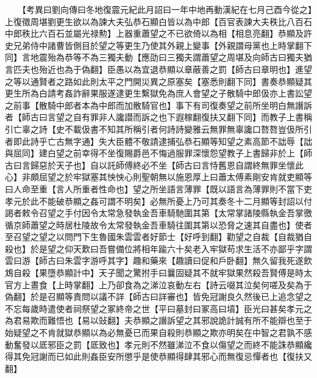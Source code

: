 　　【考異曰劉向傳曰冬地復震元紀此月詔曰一年中地再動漢紀在七月己酉今從之】　上復徵周堪劉更生欲以為諫大夫弘恭石顯白皆以為中郎【百官表諫大夫秩比八百石中郎秩比六百石並屬光禄勲】上器重蕭望之不已欲倚以為相【相息亮翻】恭顯及許史兄弟侍中諸曹皆側目於望之等更生乃使其外親上變事【外親謂母黨也上時掌翻下同】言地震殆為恭等不為三獨夫動【應劭曰三獨夫謂蕭望之周堪及向師古曰獨夫猶言匹夫也殆近也為于偽翻】臣愚以為宜退恭顯以章蔽善之罰【師古曰章明也】進望之等以通賢者之路如此則太平之門開災異之原塞矣【塞悉則翻下同】書奏恭顯疑其更生所為白請考姦詐辭果服遂逮更生繫獄免為庶人會望之子散騎中郎伋亦上書訟望之前事【散騎中郎者本為中郎而加散騎官也】事下有司復奏望之前所坐明白無譖訴者【師古曰言望之自有罪非人讒譛而訴之也下遐稼翻復扶又翻下同】而教子上書稱引亡辜之詩【史不載伋書不知其所稱引者何詩詩變雅云無罪無辜讒口嗸嗸豈伋所引者即此詩乎亡古無字通】失大臣體不敬請逮捕弘恭石顯等知望之素高節不詘辱【詘與屈同】建白望之前幸得不坐復賜爵邑不悔過服罪深懷怨望教子上書歸非於上【師古曰言歸惡於天子也】自以託師傅終必不坐【師古曰言恃舊恩自謂終無罪坐懷此心】非頗屈望之於牢獄塞其怏怏心則聖朝無以施恩厚上曰蕭太傅素剛安肯就吏顯等曰人命至重【言人所重者性命也】望之所坐語言薄罪【既以語言為薄罪則不當下吏孝元於此不能破恭顯之姦可謂不明矣】必無所憂上乃可其奏冬十二月顯等封詔以付謁者敕令召望之手付因令太常急發執金吾車騎馳圍其第【太常掌諸陵縣執金吾掌徼循京師蕭望之時居杜陵故令太常發執金吾車騎往圍其第以恐脅之速其自盡也】使者至召望之望之以問門下生魯國朱雲雲者好節士【好呼到翻】勸望之自裁【自裁猶自殺也】於是望之仰天歎曰吾嘗備位將相年踰六十矣老入牢獄苟求生活不亦鄙乎字謂雲曰游【師古曰朱雲字游呼其字】趣和藥來【趣讀曰促和戶卧翻】無久留我死遂飲鴆自殺【果墮恭顯計中】天子聞之驚拊手曰曩固疑其不就牢獄果然殺吾賢傅是時太官方上晝食【上時掌翻】上乃卻食為之涕泣哀動左右【詩云啜其泣矣何嗟及矣為于偽翻】於是召顯等責問以議不詳【師古曰詳審也】皆免冠謝良久然後已上追念望之不忘每歲時遣使者祠祭望之冢終帝之世【平曰墓封曰冢高曰墳】臣光曰甚矣孝元之為君易欺而難悟也【易以䜴翻】夫恭顯之譖訴望之其邪說詭計誠有所不能辯也至于始疑望之不肯就獄恭顯以為必無憂已而果自殺則恭顯之欺亦明矣在中智之君孰不感動奮發以厎邪臣之罰【厎致也】孝元則不然雖涕泣不食以傷望之而終不能誅恭顯纔得其免冠謝而已如此則姦臣安所懲乎是使恭顯得肆其邪心而無復忌憚者也【復扶又翻】

